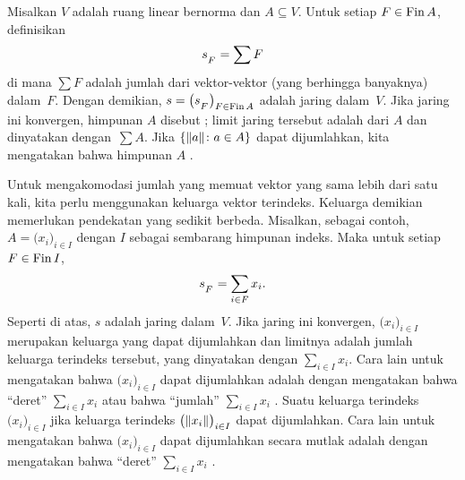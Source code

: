 \begin{defn} Misalkan $V$ adalah ruang linear bernorma dan $A \subseteq V$.
Untuk setiap $F \in \operatorname{Fin} A$, definisikan
  \[ s_{{}_{\scriptstyle{F}}} = \sum F\]
di mana $\sum F$ adalah jumlah dari vektor-vektor (yang berhingga banyaknya) dalam~$F$.
Dengan demikian, $s = \bigl(s_{{}_{\scriptstyle{F}}}\bigr)_{F \in \operatorname{Fin} A}$ adalah jaring dalam~$V$. Jika jaring ini konvergen, himpunan
$A$ disebut
; limit jaring tersebut adalah
 dari $A$ dan dinyatakan dengan~$\sum A$. Jika $\{\lVert a\rVert\colon a \in A\}$ dapat dijumlahkan, kita mengatakan bahwa himpunan $A$
.

Untuk mengakomodasi jumlah yang memuat vektor yang sama lebih dari satu kali, kita perlu menggunakan keluarga vektor terindeks.  Keluarga demikian
memerlukan pendekatan yang sedikit berbeda. Misalkan, sebagai contoh, $A = \bigl(x_i\bigr)_{i \in I}$ dengan $I$
sebagai sembarang himpunan indeks. Maka untuk setiap $F \in \operatorname{Fin} I$,
  \[ s_{{}_{\scriptstyle{F}}} = \sum_{i \in F}x_i . \]
Seperti di atas, $s$ adalah jaring dalam~$V$. Jika jaring ini konvergen, $\bigl(x_i\bigr)_{i \in I}$ merupakan
keluarga yang dapat dijumlahkan dan limitnya adalah
jumlah keluarga terindeks tersebut, yang dinyatakan dengan $\sum_{i \in I} x_i$.  Cara lain untuk mengatakan bahwa $\bigl(x_i\bigr)_{i \in I}$
dapat dijumlahkan adalah dengan mengatakan bahwa ``deret'' $\sum_{i \in I}x_i$
 atau bahwa ``jumlah'' $\sum_{i \in I}x_i$ .  Suatu keluarga terindeks $\bigl(x_i\bigr)_{i \in I}$
 jika keluarga terindeks $\bigl(\lVert x_i\rVert\bigr)_{i \in I}$ dapat dijumlahkan.  Cara lain untuk mengatakan
bahwa $\bigl(x_i\bigr)_{i \in I}$ dapat dijumlahkan secara mutlak adalah dengan mengatakan bahwa ``deret'' $\sum_{i \in I}x_i$
.


\end{defn}
